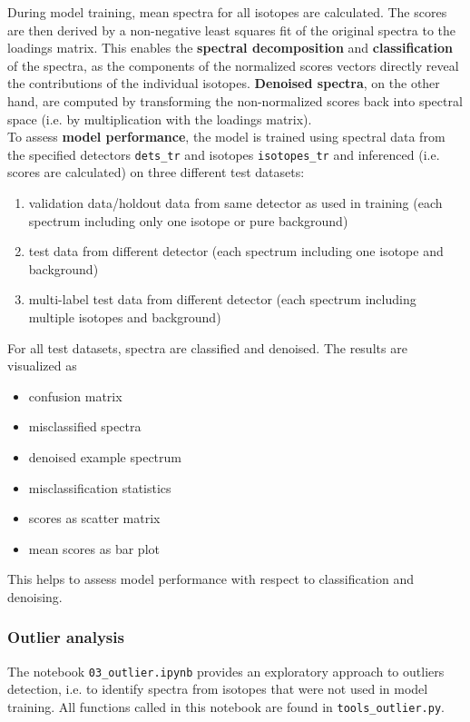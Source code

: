 \documentclass[review, 12pt, a4paper]{elsarticle}
\begin{document}
During model training, mean spectra for all isotopes are calculated. The scores are then derived by a non-negative least squares fit of the original spectra to the loadings matrix. This enables the \textbf{spectral decomposition} and \textbf{classification} of the spectra, as the components of the normalized scores vectors directly reveal the contributions of the individual isotopes. \textbf{Denoised spectra}, on the other hand, are computed by transforming the non-normalized scores back into spectral space (i.e. by multiplication with the loadings matrix). \\

To assess \textbf{model performance}, the model is trained using spectral data from the specified detectors \texttt{dets\_tr} and isotopes \texttt{isotopes\_tr} and inferenced (i.e. scores are calculated) on three different test datasets:
\begin{enumerate}
\item validation data/holdout data from same detector as used in training (each spectrum including only one isotope or pure background)
\item test data from different detector (each spectrum including one isotope and background)
\item multi-label test data from different detector (each spectrum including multiple isotopes and background)
\end{enumerate}


For all test datasets, spectra are classified and denoised. The results are visualized as 
\begin{itemize}
\item confusion matrix  
\item misclassified spectra  
\item denoised example spectrum  
\item misclassification statistics  
\item scores as scatter matrix  
\item mean scores as bar plot
\end{itemize}
  
This helps to assess model performance with respect to classification and denoising. 

\subsubsection{Outlier analysis}
\label{sec:outlier_analysis}
The notebook \texttt{03\_outlier.ipynb} provides an exploratory approach to outliers detection, i.e. to identify spectra from isotopes that were not used in model training. All functions called in this notebook are found in \texttt{tools\_outlier.py}. 
\end{document}

